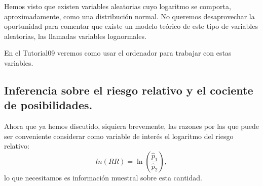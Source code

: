 Hemos visto que existen variables aleatorias cuyo logaritmo se comporta, aproximadamente, como una distribución normal. No queremos desaprovechar la oportunidad para comentar que existe un modelo teórico de este tipo de variables aleatorias, las llamadas {\sf variables lognormales}.

\begin{center}
\end{center}
En el Tutorial09 veremos como usar el ordenador para trabajar con estas variables.


\subsection{Inferencia sobre el riesgo relativo y el cociente de posibilidades.}
\label{cap09:subsec:InferenciaRiesgoRelativo}

Ahora que ya hemos discutido, siquiera brevemente, las razones por las que puede ser conveniente considerar como variable de interés el logaritmo del riesgo relativo:
\[ln(RR)=\ln\left(\dfrac{\hat p_1}{\hat p_2}\right),\]
lo que necesitamos es información muestral sobre esta cantidad.

